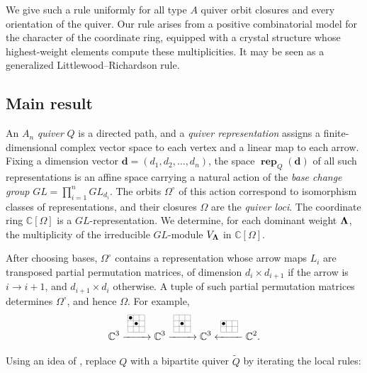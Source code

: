 \documentclass[12pt]{amsart}
\renewcommand{\d}{\mathbf{d}}
\DeclareMathOperator{\rep}{\mathbf{rep}}
\newcommand{\C}{\mathbb C}
\newcommand{\quivermatrix}[3]{
\scalebox{0.8}{
\begin{tikzpicture}[baseline=-0.5ex]
  \draw[line width=.2pt, step=.25cm] (0,0) grid (#1,#2);
  #3
\end{tikzpicture}
}
}
\theoremstyle{definition}
\theoremstyle{remark}
\begin{document}
We give  such a rule uniformly for all type $A$ quiver orbit closures and every orientation of the quiver.
Our rule arises from a positive combinatorial model for the character of the coordinate ring, equipped with a crystal structure whose highest-weight elements compute these multiplicities.
It may be seen as a generalized Littlewood--Richardson rule.


\subsection{Main result}\label{sec:mainresult}

An $A_n$ \emph{quiver} $Q$ is a directed path, and a \emph{quiver representation} assigns a finite-dimensional complex vector space to each vertex and a linear map to each arrow. Fixing a dimension vector $\mathbf d=(d_1,d_2,\ldots,d_n)$, the space 
$\rep_Q(\d)$ of all such representations is an affine space carrying a natural action of the \emph{base change group} 
$GL=\prod_{i=1}^n GL_{d_i}$. The orbits  $\Omega^{\circ}$ of this action correspond to isomorphism classes of representations, 
and their closures $\Omega$ are the \emph{quiver loci}. The coordinate ring $\C[\Omega]$ is a $GL$-representation. We determine, for each dominant weight ${\bf \Lambda}$,  the multiplicity of the irreducible $GL$-module $V_{\bf \Lambda}$ in $\C[\Omega]$.

After choosing bases, $\Omega^{\circ}$ contains a representation whose arrow maps $L_i$ are transposed
partial permutation matrices, of dimension $d_i\times d_{i+1}$ if  the arrow is $i\rightarrow i+1$, and
$d_{i+1}\times d_{i}$ otherwise. A tuple of such partial permutation matrices determines $\Omega^\circ$, and hence $\Omega$.
For example, 
\[{\mathbb C}^3 
\xrightarrow{
\quivermatrix{.75}{.75}{
  \fill (.125,.625) circle (2pt);
  \fill (.375,.375) circle (2pt);
}}
 {\mathbb C}^3 \xrightarrow{
 \quivermatrix{.75}{.75}{
  \fill (.375,.375) circle (2pt);
}
 } {\mathbb C}^3
\xleftarrow{
\quivermatrix{.75}{.5}{
  \fill (.125,.375) circle (2pt);
}
} {\mathbb C}^2.\]

Using an idea of \cite{KinserRajchgot}, replace $Q$ with a  bipartite quiver $\widetilde Q$ by iterating the local rules:
\end{document}
